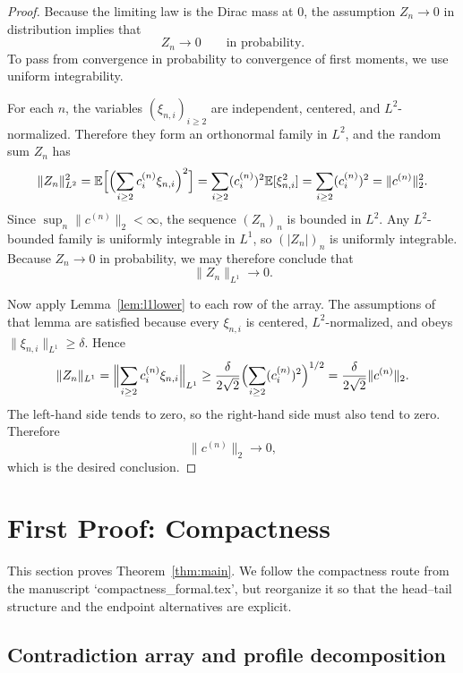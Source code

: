 \documentclass[11pt]{amsart}
\numberwithin{equation}{section}
\theoremstyle{definition}
\theoremstyle{remark}
\newcommand{\E}{\mathbb E}
\newcommand{\norm}[1]{\lVert #1 \rVert}
\begin{document}
\begin{proof}
Because the limiting law is the Dirac mass at $0$, the assumption
$Z_n\to0$ in distribution implies that
\[
Z_n\to0
\qquad\text{in probability.}
\]
To pass from convergence in probability to convergence of first moments, we use
uniform integrability.

For each $n$, the variables $(\xi_{n,i})_{i\ge2}$ are independent, centered,
and $L^2$-normalized.  Therefore they form an orthonormal family in $L^2$, and
the random sum $Z_n$ has
\[
\norm{Z_n}_{L^2}^2
=\E\Bigl[\Bigl(\sum_{i\ge2} c_i^{(n)}\xi_{n,i}\Bigr)^2\Bigr]
=\sum_{i\ge2}(c_i^{(n)})^2\E[\xi_{n,i}^2]
=\sum_{i\ge2}(c_i^{(n)})^2
=\norm{c^{(n)}}_2^2.
\]
Since $\sup_n \norm{c^{(n)}}_2<\infty$, the sequence $(Z_n)_n$ is bounded in
$L^2$.  Any $L^2$-bounded family is uniformly integrable in $L^1$, so
$(|Z_n|)_n$ is uniformly integrable.  Because $Z_n\to0$ in probability, we may
therefore conclude that
\[
\norm{Z_n}_{L^1}\longrightarrow0.
\]

Now apply Lemma~\ref{lem:l1lower} to each row of the array.  The assumptions of
that lemma are satisfied because every $\xi_{n,i}$ is centered,
$L^2$-normalized, and obeys $\norm{\xi_{n,i}}_{L^1}\ge\delta$.  Hence
\[
\norm{Z_n}_{L^1}
=\Bigl\|\sum_{i\ge2} c_i^{(n)}\xi_{n,i}\Bigr\|_{L^1}
\ge
\frac{\delta}{2\sqrt2}
\Bigl(\sum_{i\ge2}(c_i^{(n)})^2\Bigr)^{1/2}
=\frac{\delta}{2\sqrt2}\norm{c^{(n)}}_2.
\]
The left-hand side tends to zero, so the right-hand side must also tend to
zero.  Therefore
\[
\norm{c^{(n)}}_2\longrightarrow0,
\]
which is the desired conclusion.
\end{proof}

\section{First Proof: Compactness}\label{sec:compactness-proof}

This section proves Theorem~\ref{thm:main}.  We follow the compactness route
from the manuscript `compactness\_formal.tex', but reorganize it so that the
head--tail structure and the endpoint alternatives are explicit.

\subsection{Contradiction array and profile decomposition}
\end{document}
